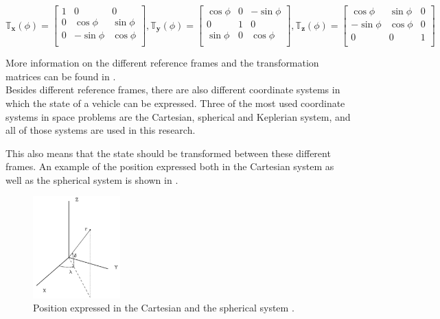 \begin{equation} \label{eq:allTransMatr}
\mathbb{T}_{\mathbf{x}}(\phi)=\begin{bmatrix}
1 & 0 & 0 \\
0 & \cos\phi & \sin\phi \\
0 & -\sin\phi & \cos\phi \\
\end{bmatrix}, 
\mathbb{T}_{\mathbf{y}}(\phi)=\begin{bmatrix}
\cos\phi & 0 & -\sin\phi \\
0 & 1 & 0\\
\sin\phi & 0 & \cos\phi \\
\end{bmatrix}, 
\mathbb{T}_{\mathbf{z}}(\phi)=\begin{bmatrix}
\cos\phi & \sin\phi & 0\\
- \sin\phi & \cos\phi & 0\\
0 & 0 & 1\\
\end{bmatrix}
\end{equation}


More information on the different reference frames and the transformation matrices can be found in . \\

Besides different reference frames, there are also different coordinate systems in which the state of a vehicle can be expressed. Three of the most used coordinate systems in space problems are the Cartesian, spherical and Keplerian system, and all of those systems are used in this research. 


This also means that the state should be transformed between these different frames. An example of the position expressed both in the Cartesian system as well as the spherical system is shown in .


\begin{figure}[!ht]
\centering
\includegraphics[width=0.3\textwidth]{figures/reference_frames/sphertocart_noomen2013basic.jpg}
\caption{Position expressed in the Cartesian and the spherical system \cite{noomen2013basic}.}
\label{fig:sphertocart_noomen2013basicFirst}
\end{figure}


